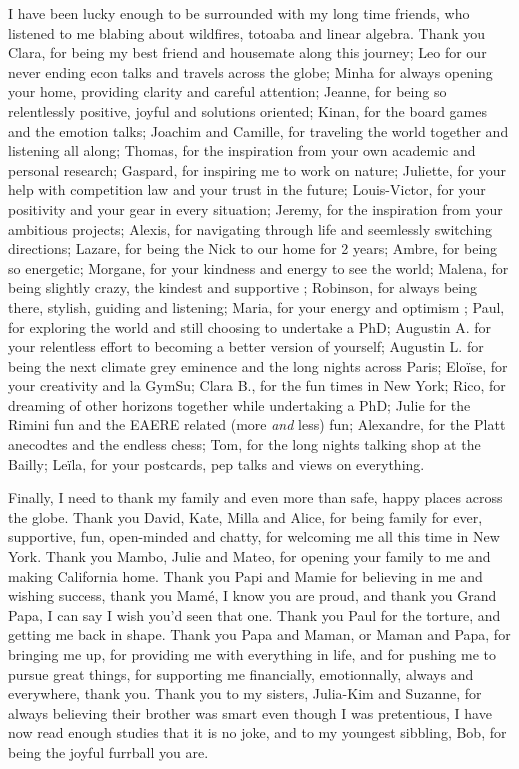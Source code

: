 I have been lucky enough to be surrounded with my long time friends, who listened to me blabing about wildfires, totoaba and linear algebra. Thank you Clara, for being my best friend and housemate along this journey; Leo for our never ending econ talks and travels across the globe; Minha for always opening your home, providing clarity and careful attention;  Jeanne, for being so relentlessly positive, joyful and solutions oriented; Kinan, for the board games and the emotion talks; Joachim and Camille, for traveling the world together and listening all along; Thomas, for the inspiration from your own academic and personal research; Gaspard, for inspiring me to work on nature; Juliette, for your help with competition law and your trust in the future; Louis-Victor, for your positivity and your gear in every situation; Jeremy, for the inspiration from your ambitious projects; Alexis, for navigating through life and seemlessly switching directions; Lazare, for being the Nick to our home for 2 years; Ambre, for being so energetic;  Morgane, for your kindness and energy to see the world; Malena, for being slightly crazy, the kindest and supportive ; Robinson, for always being there, stylish, guiding and listening; Maria, for your energy and optimism ; Paul, for exploring the world and still choosing to undertake a PhD;  Augustin A. for your relentless effort to becoming a better version of yourself; Augustin L. for being the next climate grey eminence and the long nights across Paris; Elo\"ise, for your creativity and la GymSu; Clara B., for the fun times in New York; Rico, for dreaming of other horizons together while undertaking a PhD; Julie for the Rimini fun and the EAERE related (more \textit{and} less) fun; Alexandre, for the Platt anecodtes and the endless chess; Tom, for the long nights talking shop at the Bailly; Le\"ila, for your postcards, pep talks and views on everything.

Finally, I need to thank my family and even more than safe, happy places across the globe. Thank you David, Kate, Milla and Alice, for being family for ever, supportive, fun, open-minded and chatty, for welcoming me all this time in New York. Thank you Mambo, Julie and Mateo, for opening your family to me and making California home. Thank you Papi and Mamie for believing in me and wishing success, thank you Mamé, I know you are proud, and thank you Grand Papa, I can say I wish you'd seen that one. Thank you Paul for the torture, and getting me back in shape. Thank you Papa and Maman, or Maman and Papa, for bringing me up, for providing me with everything in life, and for pushing me to pursue great things, for supporting me financially, emotionnally, always and everywhere, thank you. Thank you to my sisters, Julia-Kim and Suzanne, for always believing their brother was smart even though I was pretentious, I have now read enough studies that it is no joke, and to my youngest sibbling, Bob, for being the joyful furrball you are. 

